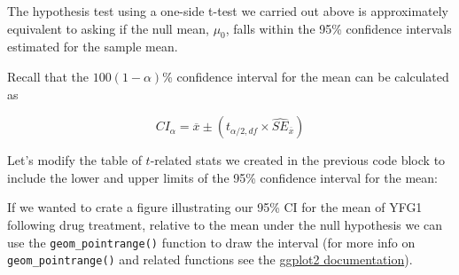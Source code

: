 \documentclass[]{book}
\newenvironment{Shaded}{\begin{snugshade}}{\end{snugshade}}
\newcommand{\CommentTok}[1]{\textcolor[rgb]{0.56,0.35,0.01}{\textit{#1}}}
\newcommand{\DataTypeTok}[1]{\textcolor[rgb]{0.13,0.29,0.53}{#1}}
\newcommand{\FloatTok}[1]{\textcolor[rgb]{0.00,0.00,0.81}{#1}}
\newcommand{\KeywordTok}[1]{\textcolor[rgb]{0.13,0.29,0.53}{\textbf{#1}}}
\newcommand{\NormalTok}[1]{#1}
\newcommand{\OperatorTok}[1]{\textcolor[rgb]{0.81,0.36,0.00}{\textbf{#1}}}
\newcommand{\StringTok}[1]{\textcolor[rgb]{0.31,0.60,0.02}{#1}}
\theoremstyle{definition}
\theoremstyle{definition}
\theoremstyle{definition}
\theoremstyle{remark}
\begin{document}
The hypothesis test using a one-side t-test we carried out above is
approximately equivalent to asking if the null mean, \(\mu_0\), falls
within the 95\% confidence intervals estimated for the sample mean.

Recall that the \(100(1-\alpha)\)\% confidence interval for the mean can
be calculated as

\[
CI_\alpha = \overline{x} \pm (t_{\alpha/2,df} \times \widehat{SE}_{\overline{x}})
\]

Let's modify the table of \(t\)-related stats we created in the previous
code block to include the lower and upper limits of the 95\% confidence
interval for the mean:

\begin{Shaded}
\end{Shaded}

If we wanted to crate a figure illustrating our 95\% CI for the mean of
YFG1 following drug treatment, relative to the mean under the null
hypothesis we can use the \texttt{geom\_pointrange()} function to draw
the interval (for more info on \texttt{geom\_pointrange()} and related
functions see the
\href{https://ggplot2.tidyverse.org/reference/geom_linerange.html}{ggplot2
documentation}).
\end{document}
